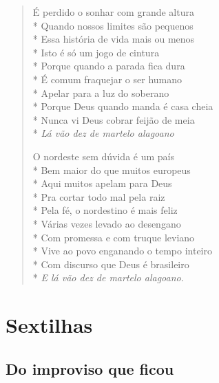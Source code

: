 \begin{verse}
É perdido o sonhar com grande altura\\*
Quando nossos limites são pequenos\\*
Essa história de vida mais ou menos\\*
Isto é só um jogo de cintura\\*
Porque quando a parada fica dura\\*
É comum fraquejar o ser humano\\*
Apelar para a luz do soberano\\*
Porque Deus quando manda é casa cheia\\*
Nunca vi Deus cobrar feijão de meia\\*
\textit{Lá vão dez de martelo alagoano}

O nordeste sem dúvida é um país\\*
Bem maior do que muitos europeus\\*
Aqui muitos apelam para Deus\\*
Pra cortar todo mal pela raiz\\*
Pela fé, o nordestino é mais feliz\\*
Várias vezes levado ao desengano\\*
Com promessa e com truque leviano\\*
Vive ao povo enganando o tempo inteiro\\*
Com discurso que Deus é brasileiro\\*
\textit{E lá vão dez de martelo alagoano}.
\end{verse}


\cleardoublepage

\part*{Sextilhas}

\chapter{Do improviso que ficou}

